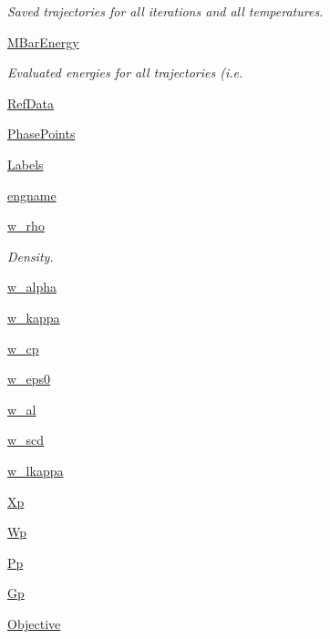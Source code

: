 \begin{DoxyCompactItemize}
\begin{DoxyCompactList}\small\item\em Saved trajectories for all iterations and all temperatures. \end{DoxyCompactList}\item 
\hyperlink{classsrc_1_1lipid_1_1Lipid_adc50926fa3f5698c8d768740b6d9cb49}{M\+Bar\+Energy}
\begin{DoxyCompactList}\small\item\em Evaluated energies for all trajectories (i.\+e. \end{DoxyCompactList}\item 
\hyperlink{classsrc_1_1lipid_1_1Lipid_a604f2edcb3ac498ba3e629052504b333}{Ref\+Data}
\item 
\hyperlink{classsrc_1_1lipid_1_1Lipid_a794c683725397ff740b466f99fd12905}{Phase\+Points}
\item 
\hyperlink{classsrc_1_1lipid_1_1Lipid_a5cb87a7c5004c42609d6b7bd8d51f407}{Labels}
\item 
\hyperlink{classsrc_1_1lipid_1_1Lipid_aed42ab281c31f39ba57cb440a58d73d5}{engname}
\item 
\hyperlink{classsrc_1_1lipid_1_1Lipid_a60d969be860474902ccbd8b68e4434bc}{w\+\_\+rho}
\begin{DoxyCompactList}\small\item\em Density. \end{DoxyCompactList}\item 
\hyperlink{classsrc_1_1lipid_1_1Lipid_a449f1bc6993ba265010ea358579d8183}{w\+\_\+alpha}
\item 
\hyperlink{classsrc_1_1lipid_1_1Lipid_a2d464b09fb3d8d3e411a8c94adab9180}{w\+\_\+kappa}
\item 
\hyperlink{classsrc_1_1lipid_1_1Lipid_a2b4875588d2a511cacb1594143eda6a8}{w\+\_\+cp}
\item 
\hyperlink{classsrc_1_1lipid_1_1Lipid_a5b93b4476dd3abefd8d7d4ca7d937d16}{w\+\_\+eps0}
\item 
\hyperlink{classsrc_1_1lipid_1_1Lipid_a8fbf8d54c0efc903909b4913d508f894}{w\+\_\+al}
\item 
\hyperlink{classsrc_1_1lipid_1_1Lipid_a68af5aa1f97716955bf72ba233b56811}{w\+\_\+scd}
\item 
\hyperlink{classsrc_1_1lipid_1_1Lipid_a3888d275433d526c0840e3af9db0fddf}{w\+\_\+lkappa}
\item 
\hyperlink{classsrc_1_1lipid_1_1Lipid_a02523ee95002c8fb8174399dd0ae67e5}{Xp}
\item 
\hyperlink{classsrc_1_1lipid_1_1Lipid_af7eb177f313db998be837975c373bdf8}{Wp}
\item 
\hyperlink{classsrc_1_1lipid_1_1Lipid_afd79ccf35fa4beeddb4a6c4a57abda2c}{Pp}
\item 
\hyperlink{classsrc_1_1lipid_1_1Lipid_a7bc29fbe5076108dc9098ffb7b88bd55}{Gp}
\item 
\hyperlink{classsrc_1_1lipid_1_1Lipid_a15e12437b3f2db86445b1e62f447c20d}{Objective}
\end{DoxyCompactItemize}


